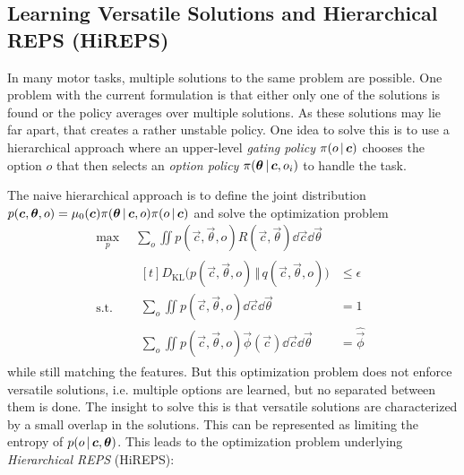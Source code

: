 		\subsection{Learning Versatile Solutions and Hierarchical REPS (HiREPS)}
			In many motor tasks, multiple solutions to the same problem are possible. One problem with the current formulation is that either only one of the solutions is found or the policy averages over multiple solutions. As these solutions may lie far apart, that creates a rather unstable policy. One idea to solve this is to use a hierarchical approach where an upper-level \emph{gating policy} \( \pi(o \,\vert\, \bm{c}) \) chooses the option \(o\) that then selects an \emph{option policy} \( \pi(\bm{\theta} \,\vert\, \bm{c}, o_i) \) to handle the task.

			The naive hierarchical approach is to define the joint distribution \( p(\bm{c}, \bm{\theta}, o) = \mu_0(\bm{c}) \pi(\bm{\theta} \,\vert\, \bm{c}, o) \pi(o \,\vert\, \bm{c}) \) and solve the optimization problem
			\begin{equation*}
				\begin{aligned}
					\max_p \,& \sum_o \iint\! p(\vec{c}, \vec{\theta}, o) R(\vec{c}, \vec{\theta}) \dd{\vec{c}} \dd{\vec{\theta}} \\
					\mathrm{s.t.} \quad&
						\begin{aligned}[t]
							D_\mathrm{KL}\big( p(\vec{c}, \vec{\theta}, o) \,\Vert\, q(\vec{c}, \vec{\theta}, o) \big) &\leq \epsilon \\
							\sum_o \iint\! p(\vec{c}, \vec{\theta}, o) \dd{\vec{c}} \dd{\vec{\theta}} &= 1 \\
							\sum_o \iint\! p(\vec{c}, \vec{\theta}, o) \vec{\phi}(\vec{c}) \dd{\vec{c}} \dd{\vec{\theta}} &= \hat{\vec{\phi}}
						\end{aligned}
				\end{aligned}
			\end{equation*}
			while still matching the features. But this optimization problem does not enforce versatile solutions, i.e. multiple options are learned, but no separated between them is done. The insight to solve this is that versatile solutions are characterized by a small overlap in the solutions. This can be represented as limiting the entropy of \( p(o \,\vert\, \bm{c}, \bm{\theta}) \). This leads to the optimization problem underlying \emph{Hierarchical REPS} (HiREPS):
